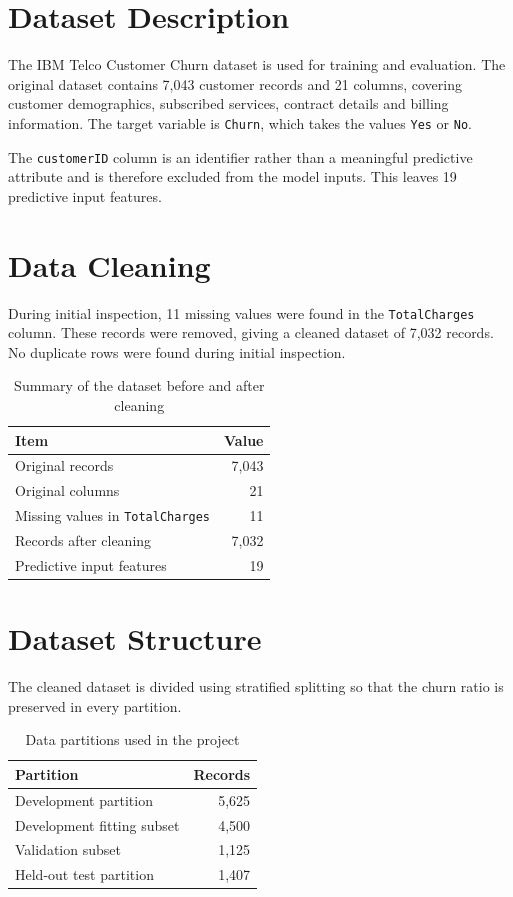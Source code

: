 \documentclass[12pt,a4paper]{report}
\begin{document}
\section{Dataset Description}

The IBM Telco Customer Churn dataset is used for training and evaluation. The original dataset contains 7,043 customer records and 21 columns, covering customer demographics, subscribed services, contract details and billing information. The target variable is \texttt{Churn}, which takes the values \texttt{Yes} or \texttt{No}.

The \texttt{customerID} column is an identifier rather than a meaningful predictive attribute and is therefore excluded from the model inputs. This leaves 19 predictive input features.

\section{Data Cleaning}

During initial inspection, 11 missing values were found in the \texttt{TotalCharges} column. These records were removed, giving a cleaned dataset of 7,032 records. No duplicate rows were found during initial inspection.

\begin{table}[!htbp]
\centering
\caption{Summary of the dataset before and after cleaning}
\begin{tabular}{lr}
\toprule
\textbf{Item} & \textbf{Value} \\
\midrule
Original records & 7,043 \\
Original columns & 21 \\
Missing values in \texttt{TotalCharges} & 11 \\
Records after cleaning & 7,032 \\
Predictive input features & 19 \\
\bottomrule
\end{tabular}
\end{table}

\section{Dataset Structure}

The cleaned dataset is divided using stratified splitting so that the churn ratio is preserved in every partition.

\begin{table}[!htbp]
\centering
\caption{Data partitions used in the project}
\begin{tabular}{lr}
\toprule
\textbf{Partition} & \textbf{Records} \\
\midrule
Development partition & 5,625 \\
\quad Development fitting subset & 4,500 \\
\quad Validation subset & 1,125 \\
Held-out test partition & 1,407 \\
\bottomrule
\end{tabular}
\end{table}
\end{document}
